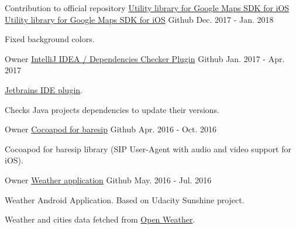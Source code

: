\begin{cventries}
  \cventry
    {Contribution to official repository \href{https://github.com/googlemaps/google-maps-ios-utils}{Utility library for Google Maps SDK for iOS}} %
    {\faMapMarker \hphantom{-} \href{https://github.com/miche-atucha/google-maps-ios-utils}{Utility library for Google Maps SDK for iOS}} %
    {\faGithubSquare\acvHeaderIconSep Github} %
    {Dec. 2017 - Jan. 2018} %
    {
      \begin{cvitems} %
        \item {Fixed background colors.}
      \end{cvitems}
    }

  \cventry
    {Owner} %
    {\href{https://github.com/miche-atucha/deps-checker}{IntelliJ IDEA / Dependencies Checker Plugin}} %
    {\faGithubSquare\acvHeaderIconSep Github} %
    {Jan. 2017 - Apr. 2017} %
    {
      \begin{cvitems} %
        \item {\href{https://plugins.jetbrains.com/plugin/9481-java-dependencies-checker}{Jetbrains IDE plugin}.}
        \item {Checks Java projects dependencies to update their versions.}
      \end{cvitems}
    }

  \cventry
    {Owner} %
    {\faMobile \hphantom{-} \href{https://github.com/miche-atucha/taresip}{Cocoapod for baresip}} %
    {\faGithubSquare\acvHeaderIconSep Github} %
    {Apr. 2016 - Oct. 2016} %
    {
      \begin{cvitems} %
        \item {Cocoapod for baresip library (SIP User-Agent with audio and video support for iOS).}
      \end{cvitems}
    }

  \cventry
    {Owner} %
    {\faAndroid \hphantom{-} \href{https://github.com/miche-atucha/weatherer}{Weather application}} %
    {\faGithubSquare\acvHeaderIconSep Github} %
    {May. 2016 - Jul. 2016} %
    {
      \begin{cvitems} %
        \item {Weather Android Application. Based on Udacity Sunshine project.}
        \item {Weather and cities data fetched from \href{https://openweathermap.org/}{Open Weather}.}
      \end{cvitems}
    }


\end{cventries}
